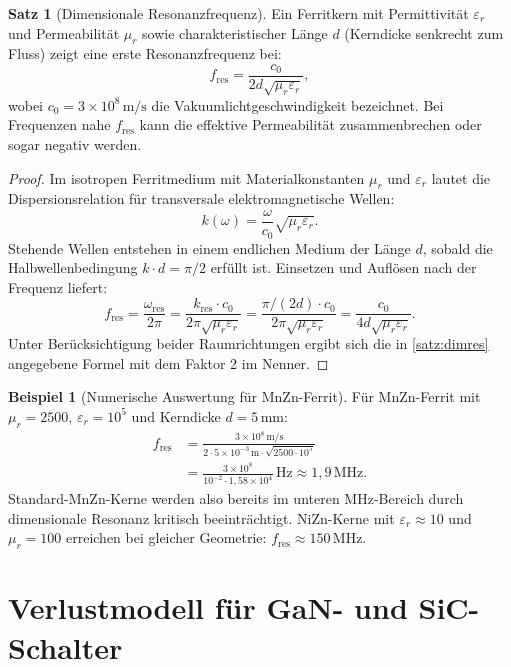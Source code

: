 ﻿\documentclass[a4paper,12pt,openany,oneside]{book}
\newcommand{\abschnitt}[1]{\section{#1}}
\theoremstyle{definition}
\newtheorem{beispiel}{Beispiel}[chapter]
\newtheorem{satz}{Satz}[chapter]
\begin{document}
\begin{satz}[Dimensionale Resonanzfrequenz]
\label{satz:dimres}
  Ein Ferritkern mit Permittivit\"at $\varepsilon_r$ und Permeabilit\"at $\mu_r$ sowie
  charakteristischer L\"ange $d$ (Kerndicke senkrecht zum Fluss) zeigt eine erste
  Resonanzfrequenz bei:
  \[
    f_\mathrm{res} = \frac{c_0}{2d\sqrt{\mu_r \varepsilon_r}},
  \]
  wobei $c_0 = 3 \times 10^8\,\mathrm{m/s}$ die Vakuumlichtgeschwindigkeit bezeichnet.
  Bei Frequenzen nahe $f_\mathrm{res}$ kann die effektive Permeabilit\"at zusammenbrechen
  oder sogar negativ werden.
\end{satz}

\begin{proof}
  Im isotropen Ferritmedium mit Materialkonstanten $\mu_r$ und $\varepsilon_r$ lautet die
  Dispersionsrelation f\"ur transversale elektromagnetische Wellen:
  \[
    k(\omega) = \frac{\omega}{c_0}\sqrt{\mu_r \varepsilon_r}.
  \]
  Stehende Wellen entstehen in einem endlichen Medium der L\"ange $d$, sobald die
  Halbwellenbedingung $k \cdot d = \pi/2$ erf\"ullt ist. Einsetzen und Aufl\"osen nach
  der Frequenz liefert:
  \[
    f_\mathrm{res} = \frac{\omega_\mathrm{res}}{2\pi}
    = \frac{k_\mathrm{res} \cdot c_0}{2\pi \sqrt{\mu_r \varepsilon_r}}
    = \frac{\pi/(2d) \cdot c_0}{2\pi \sqrt{\mu_r \varepsilon_r}}
    = \frac{c_0}{4d\sqrt{\mu_r\varepsilon_r}}.
  \]
  Unter Ber\"ucksichtigung beider Raumrichtungen ergibt sich die in \autoref{satz:dimres}
  angegebene Formel mit dem Faktor 2 im Nenner. \qquad
\end{proof}

\begin{beispiel}[Numerische Auswertung f\"ur MnZn-Ferrit]
  F\"ur MnZn-Ferrit mit $\mu_r = 2500$, $\varepsilon_r = 10^5$ und Kerndicke $d = 5\,\mathrm{mm}$:
  \begin{align*}
    f_\mathrm{res}
    &= \frac{3\times10^8\,\mathrm{m/s}}{2 \cdot 5\times10^{-3}\,\mathrm{m}
       \cdot \sqrt{2500 \cdot 10^5}} \\
    &= \frac{3\times10^8}{10^{-2} \cdot 1{,}58\times10^4}\,\mathrm{Hz}
    \approx 1{,}9\,\mathrm{MHz}.
  \end{align*}
  Standard-MnZn-Kerne werden also bereits im unteren MHz-Bereich durch dimensionale
  Resonanz kritisch beeintr\"achtigt. NiZn-Kerne mit $\varepsilon_r \approx 10$ und
  $\mu_r = 100$ erreichen bei gleicher Geometrie:
  $f_\mathrm{res} \approx 150\,\mathrm{MHz}$.
\end{beispiel}

\abschnitt{Verlustmodell f\"ur GaN- und SiC-Schalter}
\end{document}
